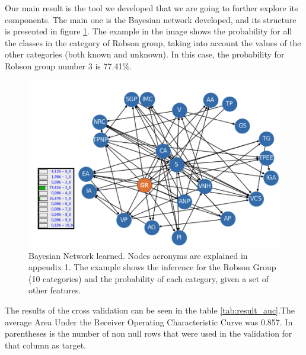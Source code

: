 Our main result is the tool we developed that we are going to further explore its components. The main one is the Bayesian network developed, and its structure is presented in figure \ref{fig:network}. The example in the image shows the probability for all the classes in the category of Robson group, taking into account the values of the other categories (both known and unknown). In this case, the probability for Robson group number 3 is 77.41\%. 
\begin{figure}[h!]
    \centering
    \caption{Bayesian Network learned. Nodes acronyms are explained in appendix 1. The example shows the inference for the Robson Group (10 categories) and the probability of each category, given a set of other features. }\label{fig:network} 
    \includegraphics[scale=0.30]{imgs/new-bn.png}
    \end{figure}


The results of the cross validation can be seen in the table \ref{tab:result_auc}.The average Area Under the Receiver Operating Characteristic Curve was 0.857. In parentheses is the number of non null rows that were used in the validation for that column as target.



